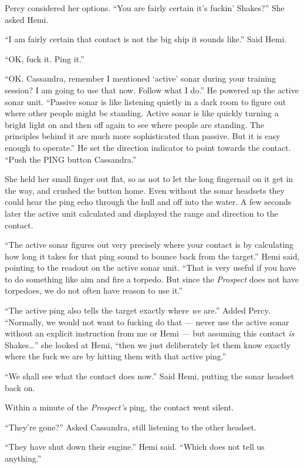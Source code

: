 \documentclass[
]{scrbook}
\begin{document}
Percy considered her options. ``You are fairly certain it's fuckin'
Shakes?'' She asked Hemi.

``I am fairly certain that contact is not the big ship it sounds like.''
Said Hemi.

``OK, fuck it. Ping it.''

``OK. Cassandra, remember I mentioned `active' sonar during your
training session? I am going to use that now. Follow what I do.'' He
powered up the active sonar unit. ``Passive sonar is like listening
quietly in a dark room to figure out where other people might be
standing. Active sonar is like quickly turning a bright light on and
then off again to see where people are standing. The principles behind
it are much more sophisticated than passive. But it is easy enough to
operate.'' He set the direction indicator to point towards the contact.
``Push the PING button Cassandra.''

She held her small finger out flat, so as not to let the long fingernail
on it get in the way, and crushed the button home. Even without the
sonar headsets they could hear the ping echo through the hull and off
into the water. A few seconds later the active unit calculated and
displayed the range and direction to the contact.

``The active sonar figures out very precisely where your contact is by
calculating how long it takes for that ping sound to bounce back from
the target.'' Hemi said, pointing to the readout on the active sonar
unit. ``That is very useful if you have to do something like aim and
fire a torpedo. But since the \emph{Prospect} does not have torpedoes,
we do not often have reason to use it.''

``The active ping also tells the target exactly where \emph{we} are.''
Added Percy. ``Normally, we would not want to fucking do that --- never
use the active sonar without an explicit instruction from me or Hemi ---
but assuming this contact \emph{is} Shakes\ldots{}'' she looked at Hemi,
``then we just deliberately let them know exactly where the fuck we are
by hitting them with that active ping.''

``We shall see what the contact does now.'' Said Hemi, putting the sonar
headset back on.

Within a minute of the \emph{Prospect's} ping, the contact went silent.

``They're gone?'' Asked Cassandra, still listening to the other headset.

``They have shut down their engine.'' Hemi said. ``Which does not tell
us anything.''
\end{document}
